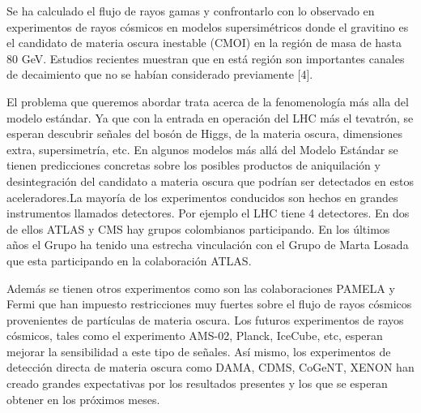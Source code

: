 \begin{ideas}
Se ha calculado el flujo de rayos gamas y confrontarlo con lo observado en experimentos de rayos cósmicos en modelos supersimétricos donde el gravitino es el candidato de materia oscura inestable (CMOI) en la región de masa de hasta 80 GeV. Estudios recientes  muestran que en está región son importantes canales de decaimiento que no se habían considerado previamente [4]. 



  El problema que queremos abordar trata acerca de la fenomenología más alla del modelo estándar.
Ya que con la entrada en operación del LHC más el tevatrón, se esperan descubrir señales del bosón de Higgs, de la materia oscura, dimensiones extra, supersimetría, etc. En algunos modelos más allá del Modelo Estándar se tienen predicciones concretas sobre los posibles productos de aniquilación y desintegración del candidato a materia oscura que podrían ser detectados en estos aceleradores.La mayoría de los experimentos conducidos son hechos en grandes instrumentos llamados detectores. Por ejemplo el LHC tiene 4 detectores. En dos de ellos ATLAS y CMS hay grupos colombianos participando. En los últimos años el Grupo ha tenido una estrecha vinculación con el Grupo de Marta Losada que esta participando en la colaboración ATLAS.

 Además se tienen otros experimentos como son las colaboraciones PAMELA y Fermi que han impuesto restricciones muy fuertes sobre el flujo de rayos cósmicos provenientes de partículas de materia oscura. Los futuros experimentos de rayos cósmicos, tales como el experimento AMS-02, Planck, IceCube, etc, esperan mejorar la sensibilidad a este tipo de señales. Así mismo, los experimentos de detección directa de materia oscura como DAMA, CDMS, CoGeNT, XENON han creado grandes expectativas por los resultados presentes y los que se esperan obtener en los próximos meses.


\end{ideas}
